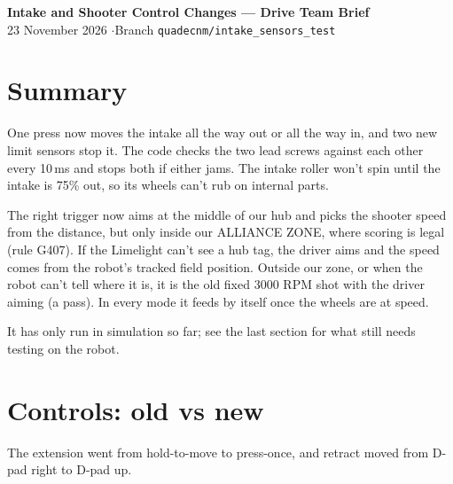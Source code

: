 \documentclass[11pt]{article}
\begin{document}
{\LARGE\bfseries\color{accent} Intake and Shooter Control Changes --- Drive Team Brief}\\[4pt]
{\small 23 November 2026 \quad$\cdot$\quad Branch \texttt{quadecnm/intake\_sensors\_test}}

\section*{Summary}

One press now moves the intake all the way out or all the way in, and two new limit sensors
stop it. The code checks the two lead screws against each other every 10\,ms and stops both if
either jams. The intake roller won't spin until the intake is 75\% out, so its wheels can't rub
on internal parts.

The right trigger now aims at the middle of our hub and picks the shooter speed from the
distance, but only inside our ALLIANCE ZONE, where scoring is legal (rule G407). If the Limelight
can't see a hub tag, the driver aims and the speed comes from the robot's tracked field position.
Outside our zone, or when the robot can't tell where it is, it is the old fixed 3000 RPM shot
with the driver aiming (a pass). In every mode it feeds by itself once the wheels are at speed.

It has only run in simulation so far; see the last section for what still needs testing on the
robot.

\section*{Controls: old vs new}

The extension went from hold-to-move to press-once, and retract moved from D-pad right to D-pad
up.
\end{document}

